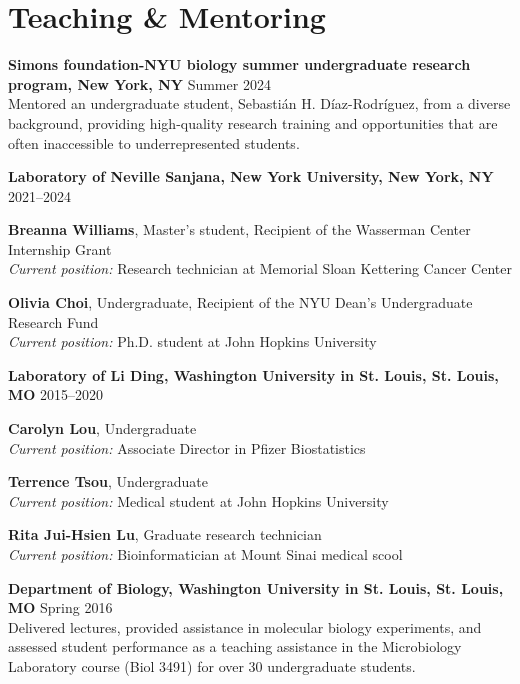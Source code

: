 \documentclass[letterpaper,11pt]{cv}
\begin{document}
\section{Teaching \& Mentoring}

\begin{entrylist}

\item \textbf{Simons foundation-NYU biology summer undergraduate research program, New York, NY} \hfill Summer 2024\\
    {\small Mentored an undergraduate student, Sebastián H. Díaz-Rodríguez, from a diverse background, providing high-quality research training and opportunities that are often inaccessible to underrepresented students.} \\

\item \textbf{Laboratory of Neville Sanjana, New York University, New York, NY} \hfill 2021--2024\\
    \begin{detaillist}
       \item \textbf{Breanna Williams}, Master's student, Recipient of the Wasserman Center Internship Grant\\
       \textit{Current position:} Research technician at Memorial Sloan Kettering Cancer Center
       \item \textbf{Olivia Choi}, Undergraduate, Recipient of the NYU Dean's Undergraduate Research Fund \\
       \textit{Current position:} Ph.D. student at John Hopkins University
    \end{detaillist}

\item \textbf{Laboratory of Li Ding, Washington University in St. Louis, St. Louis, MO} \hfill 2015--2020\\
    \begin{detaillist}
        \item \textbf{Carolyn Lou}, Undergraduate \\
        \textit{Current position:} Associate Director in Pfizer Biostatistics
        \item \textbf{Terrence Tsou}, Undergraduate \\
        \textit{Current position:} Medical student at John Hopkins University
        \item \textbf{Rita Jui-Hsien Lu}, Graduate research technician \\
        \textit{Current position:} Bioinformatician at Mount Sinai medical scool

    \end{detaillist}

\item \textbf{Department of Biology, Washington University in St. Louis, St. Louis, MO} \hfill Spring 2016\\
    {\small Delivered lectures, provided assistance in molecular biology experiments, and assessed student performance as a teaching assistance in the Microbiology Laboratory course (Biol 3491) for over 30 undergraduate students.}


\end{entrylist}
\end{document}
